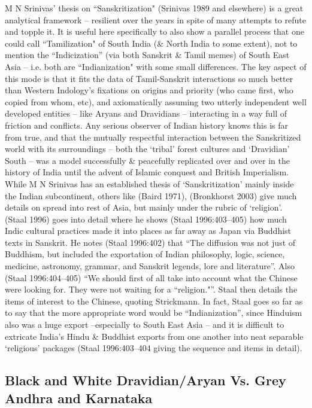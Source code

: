 M N Srinivas’ thesis on “Sanskritization" (Srinivas 1989 and elsewhere) is a great analytical framework – resilient over the years in spite of many attempts to refute and topple it. It is useful here specifically to also show a parallel process that one could call “Tamilization" of South India (\& North India to some extent), not to mention the “Indicization” (via both Sanskrit \& Tamil memes) of South East Asia -- i.e. both are “Indianization" with some small differences. The key aspect of this mode is that it fits the data of Tamil-Sanskrit interactions so much better than Western Indology’s fixations on origins and priority (who came first, who copied from whom, etc), and axiomatically assuming two utterly independent well developed entities – like Aryans and Dravidians – interacting in a way full of friction and conflicts. Any serious observer of Indian history knows this is far from true, and that the mutually respectful interaction between the Sanskritized world with its surroundings – both the ‘tribal’ forest cultures and ‘Dravidian’ South – was a model successfully \& peacefully replicated over and over in the history of India until the advent of Islamic conquest and British Imperialism. While M N Srinivas has an established thesis of ‘Sanskritization’ mainly inside the Indian subcontinent, others like (Baird 1971), (Bronkhorst 2003) give much details on spread into rest of Asia, but mainly under the rubric of ‘religion’. (Staal 1996) goes into detail where he shows (Staal 1996:403–405) how much Indic cultural practices made it into places as far away as Japan via Buddhist texts in Sanskrit. He notes (Staal 1996:402) that “The diffusion was not just of Buddhism, but included the exportation of Indian philosophy, logic, science, medicine, astronomy, grammar, and Sanskrit legends, lore and literature”. Also (Staal 1996:404–405) “We should first of all take into account what the Chinese were looking for. They were not waiting for a “religion."”. Staal then details the items of interest to the Chinese, quoting Strickmann. In fact, Staal goes so far as to say that the more appropriate word would be “Indianization”, since Hinduism also was a huge export –especially to South East Asia – and it is difficult to extricate India’s Hindu \& Buddhist exports from one another into neat separable ‘religious’ packages (Staal 1996:403–404 giving the sequence and items in detail).


\subsection*{Black and White Dravidian/Aryan Vs. Grey Andhra and Karnataka}

